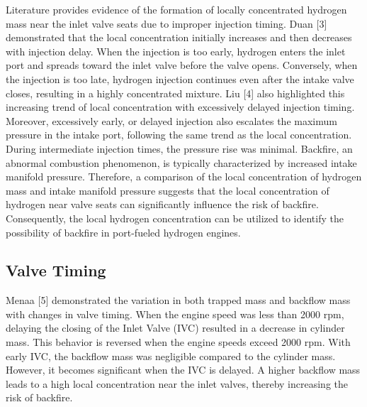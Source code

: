 \documentclass[conference]{IEEEtran}
\begin{document}
Literature provides evidence of the formation of locally concentrated hydrogen mass near the inlet valve seats due to improper injection timing. Duan [3] demonstrated that the local concentration initially increases and then decreases with injection delay. When the injection is too early, hydrogen enters the inlet port and spreads toward the inlet valve before the valve opens. Conversely, when the injection is too late, hydrogen injection continues even after the intake valve closes, resulting in a highly concentrated mixture. Liu [4] also highlighted this increasing trend of local concentration with excessively delayed injection timing. Moreover, excessively early, or delayed injection also escalates the maximum pressure in the intake port, following the same trend as the local concentration. During intermediate injection times, the pressure rise was minimal. Backfire, an abnormal combustion phenomenon, is typically characterized by increased intake manifold pressure. Therefore, a comparison of the local concentration of hydrogen mass and intake manifold pressure suggests that the local concentration of hydrogen near valve seats can significantly influence the risk of backfire. Consequently, the local hydrogen concentration can be utilized to identify the possibility of backfire in port-fueled hydrogen engines.


\subsection{Valve Timing}

Menaa [5] demonstrated the variation in both trapped mass and backflow mass with changes in valve timing. When the engine speed was less than 2000 rpm, delaying the closing of the Inlet Valve (IVC) resulted in a decrease in cylinder mass. This behavior is reversed when the engine speeds exceed 2000 rpm. With early IVC, the backflow mass was negligible compared to the cylinder mass. However, it becomes significant when the IVC is delayed. A higher backflow mass leads to a high local concentration near the inlet valves, thereby increasing the risk of backfire.\\
\end{document}
